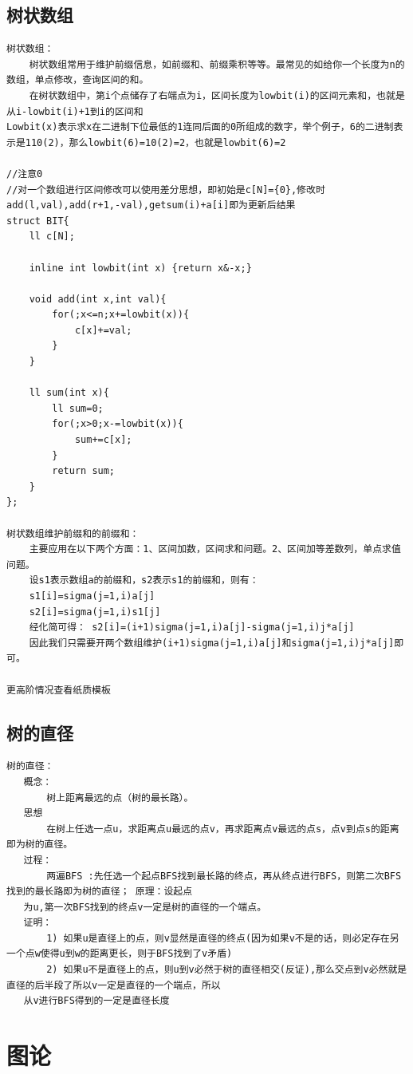 \documentclass[twoside]{article}
\begin{document}
\subsection{树状数组}
\begin{lstlisting}
树状数组：
	树状数组常用于维护前缀信息，如前缀和、前缀乘积等等。最常见的如给你一个长度为n的数组，单点修改，查询区间的和。
	在树状数组中，第i个点储存了右端点为i，区间长度为lowbit(i)的区间元素和，也就是从i-lowbit(i)+1到i的区间和
Lowbit(x)表示求x在二进制下位最低的1连同后面的0所组成的数字，举个例子，6的二进制表示是110(2)，那么lowbit(6)=10(2)=2，也就是lowbit(6)=2

//注意0
//对一个数组进行区间修改可以使用差分思想，即初始是c[N]={0},修改时add(l,val),add(r+1,-val),getsum(i)+a[i]即为更新后结果
struct BIT{
    ll c[N];

    inline int lowbit(int x) {return x&-x;}

    void add(int x,int val){
        for(;x<=n;x+=lowbit(x)){
            c[x]+=val;
        }
    }

    ll sum(int x){
        ll sum=0;
        for(;x>0;x-=lowbit(x)){
            sum+=c[x];
        }
        return sum;
    }
};

树状数组维护前缀和的前缀和：
    主要应用在以下两个方面：1、区间加数，区间求和问题。2、区间加等差数列，单点求值问题。
    设s1表示数组a的前缀和，s2表示s1的前缀和，则有：
    s1[i]=sigma(j=1,i)a[j]
    s2[i]=sigma(j=1,i)s1[j]
    经化简可得： s2[i]=(i+1)sigma(j=1,i)a[j]-sigma(j=1,i)j*a[j]
    因此我们只需要开两个数组维护(i+1)sigma(j=1,i)a[j]和sigma(j=1,i)j*a[j]即可。

更高阶情况查看纸质模板

\end{lstlisting}
\subsection{树的直径}
\begin{lstlisting}
树的直径：
   概念：    
       树上距离最远的点（树的最长路）。
   思想
       在树上任选一点u，求距离点u最远的点v，再求距离点v最远的点s，点v到点s的距离即为树的直径。
   过程：
       两遍BFS :先任选一个起点BFS找到最长路的终点，再从终点进行BFS，则第二次BFS找到的最长路即为树的直径； 原理：设起点
   为u,第一次BFS找到的终点v一定是树的直径的一个端点。
   证明：
       1) 如果u是直径上的点，则v显然是直径的终点(因为如果v不是的话，则必定存在另一个点w使得u到w的距离更长，则于BFS找到了v矛盾) 
       2) 如果u不是直径上的点，则u到v必然于树的直径相交(反证),那么交点到v必然就是直径的后半段了所以v一定是直径的一个端点，所以
   从v进行BFS得到的一定是直径长度\end{lstlisting}
\clearpage\section{图论}
\end{document}
